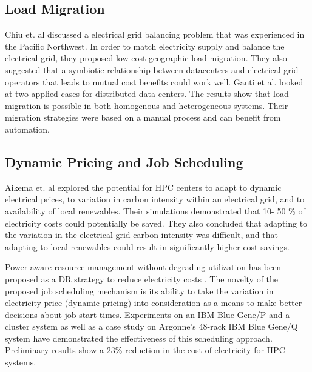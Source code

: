 \subsection{Load Migration}
Chiu et. al \cite{chiu_electric_2012} discussed a electrical grid balancing problem that was experienced in the Pacific Northwest. In order to match electricity supply and balance the electrical grid, they proposed low-cost geographic load migration. They also suggested that a symbiotic relationship between datacenters and electrical grid operators that leads to mutual cost benefits could work well.  Ganti et al. \cite{Ghatikar2012b} looked at two applied cases for distributed data centers. The results show that load migration is possible in both homogenous and heterogeneous systems. Their migration strategies were based on a manual process and can benefit from automation.

\subsection{Dynamic Pricing and Job Scheduling}
Aikema et. al \cite{aikema_electrical_2011} explored the potential for HPC centers to adapt to dynamic electrical prices, to variation in carbon intensity within an electrical grid, and to availability of local renewables. Their simulations demonstrated that 10- 50 \% of electricity costs could potentially be saved. They also concluded that adapting to the variation in the electrical grid carbon intensity was difficult, and that adapting to local renewables could result in significantly higher cost savings.

Power-aware resource management without degrading utilization has been proposed as a DR strategy to reduce electricity costs \cite{yang_integrating_2013,zhou_reducing_2013}. The novelty of the proposed job scheduling mechanism is its ability to take the variation in electricity price (dynamic pricing) into consideration as a means to make better decisions about job start times. Experiments on an IBM Blue Gene/P and a cluster system as well as a case study on Argonne's 48-rack IBM Blue Gene/Q system have demonstrated the effectiveness of this scheduling approach. Preliminary results show a 23\% reduction in the cost of electricity for HPC systems.
